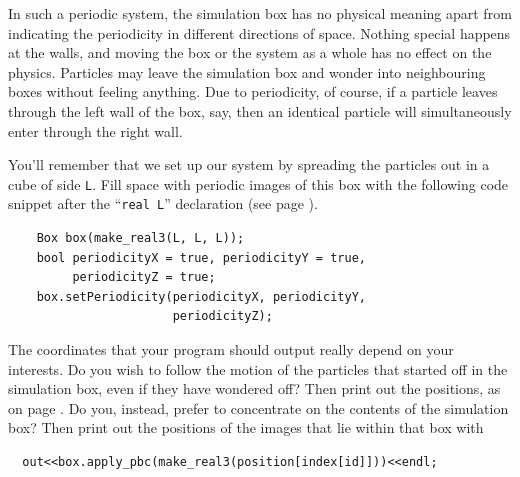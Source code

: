 In such a periodic system, the simulation box has no physical meaning apart from 
indicating the periodicity in different directions of space. Nothing special 
happens at the walls, and moving the box or the system as a whole has no effect 
on the physics. Particles may leave the simulation box and wonder into 
neighbouring boxes without feeling anything. Due to periodicity, of course, if a 
particle leaves through the left wall of the box, say, then an identical 
particle will simultaneously enter through the right wall.

You'll remember that we set up our system by spreading the particles out in a
cube of side \texttt{L}. Fill space with periodic images of this box with the
following code snippet after the ``\texttt{real L}'' declaration (see page
\pageref{initialConditions}).
\begin{lstlisting}
    Box box(make_real3(L, L, L));
    bool periodicityX = true, periodicityY = true,
         periodicityZ = true;
    box.setPeriodicity(periodicityX, periodicityY,
                       periodicityZ);
\end{lstlisting}
The coordinates that your program should output really depend on your interests. 
Do you wish to follow the motion of the particles that started off in the 
simulation box, even if they have wondered off? Then print out the positions, as 
on page \pageref{particlePositions}. Do you, instead, prefer to concentrate on 
the contents of the simulation box? Then print out the positions of the images 
that lie within that box with
\begin{lstlisting}
  out<<box.apply_pbc(make_real3(position[index[id]]))<<endl;
\end{lstlisting}

